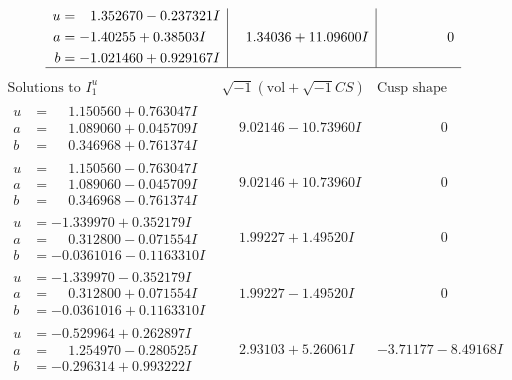 \documentclass[1p]{elsarticle_modified}
\theoremstyle{definition}
\newcommand{\I}{\sqrt{-1}}
\begin{document}
$$\begin{array}{c|c|c}
\begin{aligned}
u &= \phantom{-}1.352670 - 0.237321 I \\
a &= -1.40255 + 0.38503 I \\
b &= -1.021460 + 0.929167 I\end{aligned}
 & \phantom{-}1.34036 + 11.09600 I & \phantom{-0.000000 } 0\\
 \hline 
 \end{array}$$\newpage$$\begin{array}{c|c|c}  
\text{Solutions to }I^u_{1}& \I (\text{vol} + \sqrt{-1}CS) & \text{Cusp shape}\\
 \hline 
\begin{aligned}
u &= \phantom{-}1.150560 + 0.763047 I \\
a &= \phantom{-}1.089060 + 0.045709 I \\
b &= \phantom{-}0.346968 + 0.761374 I\end{aligned}
 & \phantom{-}9.02146 - 10.73960 I & \phantom{-0.000000 } 0 \\ \hline\begin{aligned}
u &= \phantom{-}1.150560 - 0.763047 I \\
a &= \phantom{-}1.089060 - 0.045709 I \\
b &= \phantom{-}0.346968 - 0.761374 I\end{aligned}
 & \phantom{-}9.02146 + 10.73960 I & \phantom{-0.000000 } 0 \\ \hline\begin{aligned}
u &= -1.339970 + 0.352179 I \\
a &= \phantom{-}0.312800 - 0.071554 I \\
b &= -0.0361016 - 0.1163310 I\end{aligned}
 & \phantom{-}1.99227 + 1.49520 I & \phantom{-0.000000 } 0 \\ \hline\begin{aligned}
u &= -1.339970 - 0.352179 I \\
a &= \phantom{-}0.312800 + 0.071554 I \\
b &= -0.0361016 + 0.1163310 I\end{aligned}
 & \phantom{-}1.99227 - 1.49520 I & \phantom{-0.000000 } 0 \\ \hline\begin{aligned}
u &= -0.529964 + 0.262897 I \\
a &= \phantom{-}1.254970 - 0.280525 I \\
b &= -0.296314 + 0.993222 I\end{aligned}
 & \phantom{-}2.93103 + 5.26061 I & -3.71177 - 8.49168 I \\ \hline\begin{aligned}

\end{aligned}
\end{array}$$
\end{document}
